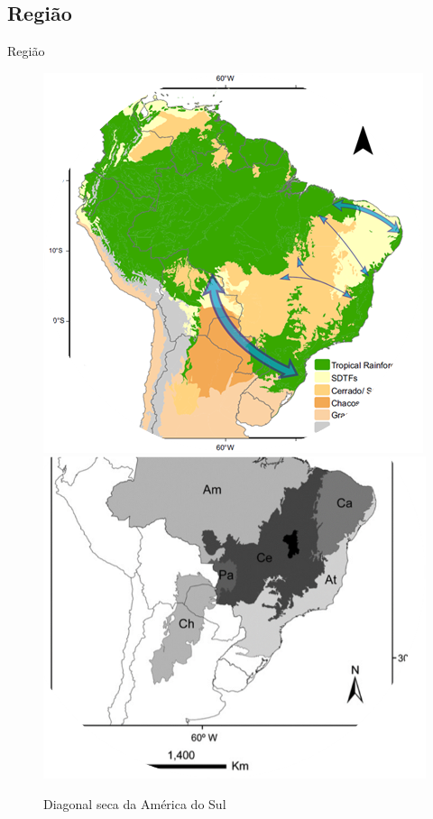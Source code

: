 \documentclass{beamer}
\begin{document}
  \subsection{Região}
    \begin{frame}{Região}
      \begin{figure}[!h]
          \centering
  	      \includegraphics[scale=0.7]{diagseca2.png}\quad
  	      \includegraphics[scale=0.5]{diagseca.png}
          \caption{Diagonal seca da América do Sul}
          \label{Rotulo}
      \end{figure}
    \end{frame}
    
\end{document}
